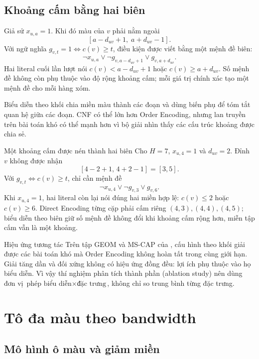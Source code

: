 \subsection{Khoảng cấm bằng hai biên}

Giả sử \(x_{u,a}=1\). Khi đó màu của \(v\) phải nằm ngoài
\[
  [a-d_{uv}+1,\;a+d_{uv}-1].
\]
Với ngữ nghĩa \(g_{v,t}=1\iff c(v)\ge t\), điều kiện được viết bằng một mệnh đề
biên:
\[
  \neg x_{u,a}
  \lor
  \neg g_{v,a-d_{uv}+1}
  \lor
  g_{v,a+d_{uv}}.
\]
Hai literal cuối lần lượt nói \(c(v)<a-d_{uv}+1\) hoặc
\(c(v)\ge a+d_{uv}\). Số mệnh đề không còn phụ thuộc vào độ rộng khoảng cấm;
mỗi giá trị chính xác tạo một mệnh đề cho mỗi hàng xóm.

Biểu diễn theo khối chia miền màu thành các đoạn và dùng biến phụ để tóm tắt quan
hệ giữa các đoạn. CNF có thể lớn hơn Order Encoding, nhưng lan truyền trên bài
toán khó có thể mạnh hơn vì bộ giải nhìn thấy các cấu trúc khoảng được chia sẻ.

\begin{workedexample}{Một khoảng cấm được nén thành hai biên}
Cho \(H=7\), \(x_{u,4}=1\) và \(d_{uv}=2\). Đỉnh \(v\) không được nhận
\[
  [4-2+1,\,4+2-1]=[3,5].
\]
Với \(g_{v,t}\Leftrightarrow c(v)\ge t\), chỉ cần mệnh đề
\[
  \neg x_{u,4}\lor\neg g_{v,3}\lor g_{v,6}.
\]
Khi \(x_{u,4}=1\), hai literal còn lại nói đúng hai miền hợp lệ:
\(c(v)\le2\) hoặc \(c(v)\ge6\). Direct Encoding từng cặp phải cấm riêng
\((4,3),(4,4),(4,5)\); biểu diễn theo biên giữ số mệnh đề không đổi khi khoảng
cấm rộng hơn, miễn tập cấm vẫn là một khoảng.
\end{workedexample}

\begin{resultbox}{Hiệu ứng tương tác}
Trên tập GEOM và MS-CAP của \textcite{nguyen2026bcp}, cấu hình theo khối giải
được các bài toán khó mà Order Encoding không hoàn tất trong cùng giới hạn.
Giải tăng dần và đối xứng không có hiệu ứng đồng đều: lợi ích phụ thuộc vào họ
biểu diễn. Vì vậy thí nghiệm phân tích thành phần (ablation study) nên dùng đơn vị
\(\text{phép biểu diễn}\times\text{đặc trưng}\), không chỉ so trung bình từng
đặc trưng.
\end{resultbox}

\section{Tô đa màu theo bandwidth}

\subsection{Mô hình ô màu và giảm miền}

